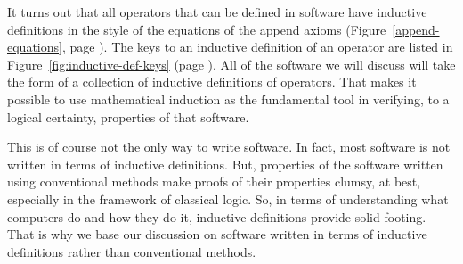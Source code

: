 It turns out that all operators that can be defined in software
have inductive definitions in the style of the equations
of the append axioms (Figure~\ref{append-equations}, page \pageref{append-equations}).
The keys to an inductive definition of an operator are  listed in
Figure~\ref{fig:inductive-def-keys} (page \pageref{fig:inductive-def-keys}).
All of the software we will discuss will take the form of a collection
of inductive definitions of operators.
That makes it possible to use mathematical induction as
the fundamental tool in verifying, to a logical certainty,
properties of that software.

This is of course not the only way to write software.
In fact, most software is not written in terms of inductive definitions.
But, properties of the software written using conventional methods
make
proofs of their properties clumsy, at best, especially in the framework of classical logic.
So, in terms of understanding what computers do and how they do it,
inductive definitions provide solid footing.
That is why we base our discussion on software written
in terms of inductive definitions rather than conventional methods.

